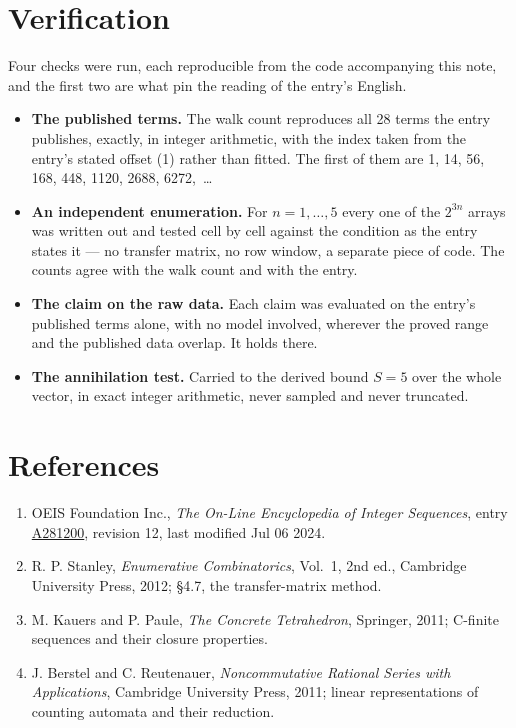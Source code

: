 \documentclass[11pt]{article}
\theoremstyle{definition}
\begin{document}
\section{Verification}

Four checks were run, each reproducible from the code accompanying this note, and the first two are what pin the reading of the entry's English.

\begin{itemize}

\item {\bfseries The published terms.} The walk count reproduces all 28 terms the entry publishes, exactly, in integer arithmetic, with the index taken from the entry's stated offset (1) rather than fitted. The first of them are 1, 14, 56, 168, 448, 1120, 2688, 6272,~\dots

\item {\bfseries An independent enumeration.} For $n = 1,\dots,5$ every one of the $2^{3n}$ arrays was written out and tested cell by cell against the condition as the entry states it --- no transfer matrix, no row window, a separate piece of code. The counts agree with the walk count and with the entry.

\item {\bfseries The claim on the raw data.} Each claim was evaluated on the entry's published terms alone, with no model involved, wherever the proved range and the published data overlap. It holds there.

\item {\bfseries The annihilation test.} Carried to the derived bound $S = 5$ over the whole vector, in exact integer arithmetic, never sampled and never truncated.

\end{itemize}

\section{References}

\begin{enumerate}

\item OEIS Foundation Inc., \emph{The On-Line Encyclopedia of Integer Sequences}, entry \href{https://oeis.org/A281200}{A281200}, revision 12, last modified Jul 06 2024.

\item R. P. Stanley, \emph{Enumerative Combinatorics}, Vol.~1, 2nd ed., Cambridge University Press, 2012; \S4.7, the transfer-matrix method.

\item M. Kauers and P. Paule, \emph{The Concrete Tetrahedron}, Springer, 2011; C-finite sequences and their closure properties.

\item J. Berstel and C. Reutenauer, \emph{Noncommutative Rational Series with Applications}, Cambridge University Press, 2011; linear representations of counting automata and their reduction.

\end{enumerate}
\end{document}
